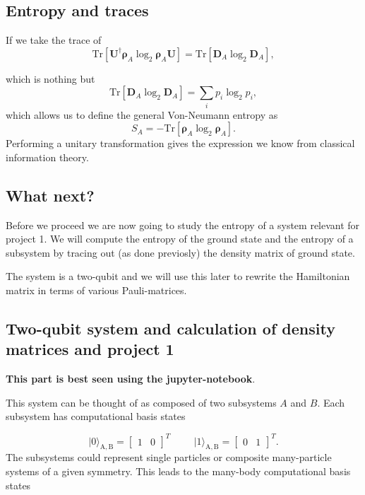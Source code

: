 \documentclass[%
oneside,                 %
final,                   %
10pt]{article}
\begin{document}
\subsection{Entropy and traces}

If we take the trace of 
\[
\mathrm{Tr}[\bm{U}^{\dagger}\bm{\rho}_A\log_2{\bm{\rho}_A}\bm{U}]=\mathrm{Tr}[\bm{D}_A \log_2{\bm{D}_A}],
\]

which is nothing but
\[
\mathrm{Tr}[\bm{D}_A \log_2{\bm{D}_A}]=\sum_i p_i\log_2{p_i},
\]
which allows us to define the general Von-Neumann entropy as
\[
S_A=-\mathrm{Tr}[\bm{\rho}_A\log_2{\bm{\rho}_A}].
\]
Performing a unitary transformation gives the expression we know from classical information theory.

\subsection{What next?}

Before we proceed we are now going to study the entropy of a system
relevant for project 1.  We will compute the entropy of the ground
state and the entropy of a subsystem by tracing out (as done
previosly) the density matrix of ground state.

The system is a two-qubit and we will use this later to rewrite the
Hamiltonian matrix in terms of various Pauli-matrices.

\subsection{Two-qubit system and calculation of density matrices and project 1}

\textbf{This part is best seen using the jupyter-notebook}.

This system can be thought of as composed of two subsystems
$A$ and $B$. Each subsystem has computational basis states

\[
\vert 0\rangle_{\mathrm{A,B}}=\begin{bmatrix} 1 & 0\end{bmatrix}^T \hspace{1cm} \vert 1\rangle_{\mathrm{A,B}}=\begin{bmatrix} 0 & 1\end{bmatrix}^T.
\]
The subsystems could represent single particles or composite many-particle systems of a given symmetry.
This leads to the many-body computational basis states
\end{document}
